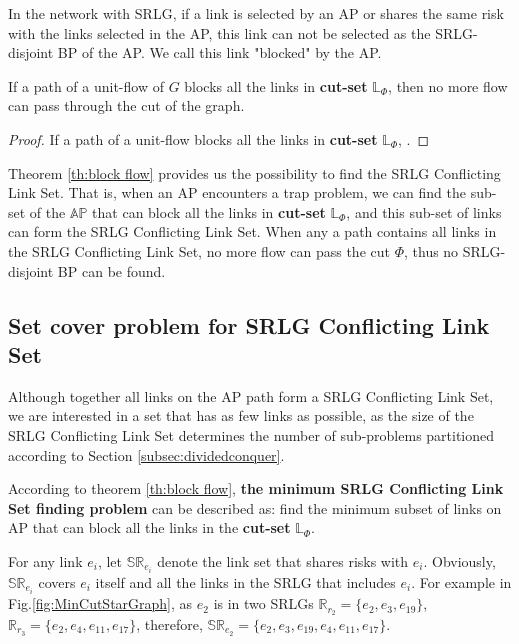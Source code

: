 In the network with SRLG, if  a link is selected by an AP or shares the same risk with the links selected in the AP, this link can not be selected as the SRLG-disjoint BP of the AP. We call this link "blocked" by the AP.

\begin{theorem}
    If a path of a unit-flow of $G$ blocks all the links in \textbf{cut-set} $\mathbb{L}_{\Phi}$, then no more flow can pass through the cut of the graph.
\label{th:block flow}
\end{theorem}

\begin{proof}
    If a path of a unit-flow blocks all the links in \textbf{cut-set} $\mathbb{L}_{\Phi}$, .
\end{proof}

Theorem \ref{th:block flow} provides us the possibility to find the SRLG Conflicting Link Set. That is, when an AP encounters a trap problem, we can find the sub-set of the $\mathbb{AP}$  that can block all the links in \textbf{cut-set} $\mathbb{L}_{\Phi}$, and this sub-set of links can form the  SRLG Conflicting Link Set. When any a path contains all links in the SRLG Conflicting Link Set, no more flow can pass the cut $\Phi$, thus no SRLG-disjoint BP can be found.


\subsection{Set cover problem for SRLG Conflicting Link Set}
\label{subsec:Set cover problem for SRLG Conflicting Link Set}
Although together all links on the AP path form a SRLG Conflicting Link Set, we are interested in a set that has as few links as possible, as the size of the SRLG Conflicting Link Set determines the number of sub-problems partitioned according to Section \ref{subsec:dividedconquer}.





According to theorem \ref{th:block flow}, \textbf{the minimum SRLG Conflicting Link Set finding problem} can be described as:  find the minimum subset of links on AP  that can block all the  links in the \textbf{cut-set} $\mathbb{L}_{\Phi}$.

For any link $e_i$, let $\mathbb{SR}_{e_i}$ denote the link set that shares risks with $e_i$. Obviously, $\mathbb{SR}_{e_i}$ covers $e_i$ itself and all the links in the SRLG that includes $e_i$. For example in Fig.\ref{fig:MinCutStarGraph}, as $e_2$ is in two SRLGs $\mathbb{R}_{r_2}=\{e_2,e_3,e_{19}\}$, $\mathbb{R}_{r_3}=\{e_2,e_4,e_{11},e_{17}\}$, therefore, $\mathbb{SR}_{e_2}=\{e_2,e_3,e_{19},e_4,e_{11},e_{17}\}$.

